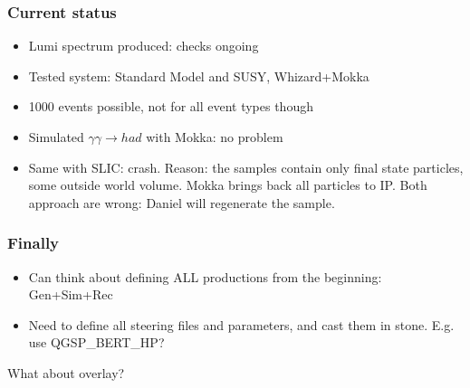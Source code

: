 \documentclass{beamer}
\begin{document}
\begin{frame}
\frametitle{Current status}
\begin{itemize}
  \item Lumi spectrum produced: checks ongoing
  \item Tested system: Standard Model and SUSY, Whizard+Mokka
  \item 1000 events possible, not for all event types though
  \item Simulated $\gamma\gamma \to had$ with Mokka: no problem
  \item Same with SLIC: crash. Reason: the samples contain only final state
  particles, some outside world volume. Mokka brings back all particles to IP.
  Both approach are wrong: Daniel will regenerate the sample. 
\end{itemize}
\end{frame}
\begin{frame}
\frametitle{Finally}
\begin{itemize}
  \item Can think about defining ALL productions from the beginning: Gen+Sim+Rec
  \item Need to define all steering files and parameters, and cast them in
  stone. E.g. use QGSP\_BERT\_HP?
\end{itemize}
\alert{What about overlay?}
\end{frame}
\end{document}
